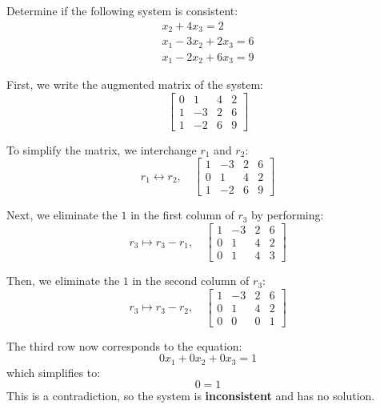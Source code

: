 \begin{example}
    \label{ex:inconsistent-system}
Determine if the following system is consistent:
        \[
            \begin{array}{r}
            x_2+4 x_3=2 \\
            x_1-3 x_2+2 x_3=6 \\
            x_1-2 x_2+6 x_3=9
            \end{array}
        \]
\end{example}

\begin{solution}
    First, we write the augmented matrix of the system:
    \[
    \left[\begin{array}{cccc}
    0 & 1 & 4 & 2 \\
    1 & -3 & 2 & 6 \\
    1 & -2 & 6 & 9
    \end{array}\right]
    \]
    
    To simplify the matrix, we interchange $r_1$ and $r_2$:
    \[
    r_1 \leftrightarrow r_2, \quad \left[\begin{array}{cccc}
    1 & -3 & 2 & 6 \\
    0 & 1 & 4 & 2 \\
    1 & -2 & 6 & 9
    \end{array}\right]
    \]
    
    Next, we eliminate the $1$ in the first column of $r_3$ by performing:
    \[
    r_3 \mapsto r_3 - r_1, \quad \left[\begin{array}{cccc}
    1 & -3 & 2 & 6 \\
    0 & 1 & 4 & 2 \\
    0 & 1 & 4 & 3
    \end{array}\right]
    \]
    
    Then, we eliminate the $1$ in the second column of $r_3$:
    \[
    r_3 \mapsto r_3 - r_2, \quad \left[\begin{array}{cccc}
    1 & -3 & 2 & 6 \\
    0 & 1 & 4 & 2 \\
    0 & 0 & 0 & 1
    \end{array}\right]
    \]
    
    The third row now corresponds to the equation:
    \[
    0x_1 + 0x_2 + 0x_3 = 1
    \]
    which simplifies to:
    \[
    0 = 1
    \]
    This is a contradiction, so the system is \textbf{inconsistent} and has no solution. \end{solution}

